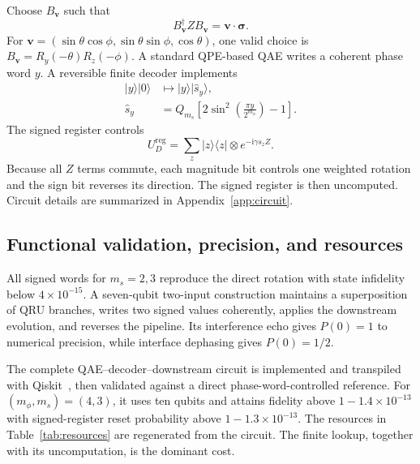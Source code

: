 \documentclass[a4paper,twocolumn,11pt,unpublished]{quantumarticle}
\newcommand{\ii}{\mathrm{i}}
\newcommand{\ket}[1]{|#1\rangle}
\newcommand{\bra}[1]{\langle #1|}
\newcommand{\pauli}{\boldsymbol{\sigma}}
\newcommand{\axis}{\boldsymbol{v}}
\begin{document}
Choose $B_{\axis}$ such that
\begin{equation}
B_{\axis}^{\dagger}ZB_{\axis}=\axis\cdot\pauli.
\end{equation}
For $\axis=(\sin\theta\cos\phi,\sin\theta\sin\phi,\cos\theta)$, one valid choice is $B_{\axis}=R_y(-\theta)R_z(-\phi)$. A standard QPE-based QAE writes a coherent phase word $y$. A reversible finite decoder implements
\begin{equation}
\begin{aligned}
\ket{y}\ket{0}&\longmapsto\ket{y}\ket{\widehat s_y},\\
\widehat s_y&=Q_{m_s}\!\left[2\sin^2\!\left(\frac{\pi y}{2^{m_\phi}}\right)-1\right].
\end{aligned}
\end{equation}
The signed register controls
\begin{equation}
U_D^{\mathrm{reg}}
=\sum_z\ket{z}\!\bra{z}\otimes e^{-\ii\gamma s_zZ}.
\end{equation}
Because all $Z$ terms commute, each magnitude bit controls one weighted rotation and the sign bit reverses its direction. The signed register is then uncomputed. Circuit details are summarized in Appendix~\ref{app:circuit}.

\subsection{Functional validation, precision, and resources}

All signed words for $m_s=2,3$ reproduce the direct rotation with state infidelity below $4\times10^{-15}$. A seven-qubit two-input construction maintains a superposition of QRU branches, writes two signed values coherently, applies the downstream evolution, and reverses the pipeline. Its interference echo gives $P(0)=1$ to numerical precision, while interface dephasing gives $P(0)=1/2$.

The complete QAE--decoder--downstream circuit is implemented and transpiled with Qiskit~\cite{Qiskit2024}, then validated against a direct phase-word-controlled reference. For $(m_\phi,m_s)=(4,3)$, it uses ten qubits and attains fidelity above $1-1.4\times10^{-13}$ with signed-register reset probability above $1-1.3\times10^{-13}$. The resources in Table~\ref{tab:resources} are regenerated from the circuit. The finite lookup, together with its uncomputation, is the dominant cost.
\end{document}
